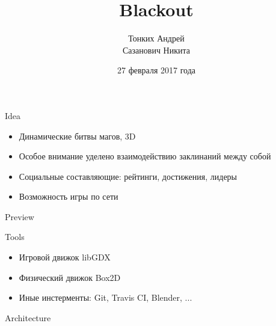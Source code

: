 \documentclass[12pt]{beamer}
\begin{document}
\title{Blackout}

\author[]{
    Тонких Андрей \\
    Сазанович Никита \\
}
\date{27 февраля 2017 года}

\frame{\titlepage}


\begin{frame}{Idea}
    \begin{itemize}
        \item <1-> Динамические битвы магов, 3D
        \item <2-> Особое внимание уделено взаимодействию заклинаний между собой
	\item <3-> Социальные составляющие: рейтинги, достижения, лидеры
        \item <4-> Возможность игры по сети
    \end{itemize}
\end{frame}



\begin{frame} {Preview}
\end{frame}


\begin{frame} {Tools}
    \begin{itemize}
        \item <1-> Игровой движок libGDX
        \item <2-> Физический движок Box2D
        \item <3-> Иные инстерменты: Git, Travis CI, Blender, ...
    \end{itemize}
\end{frame}


\begin{frame} {Architecture}
\noindent{}
\end{frame}
\end{document}
